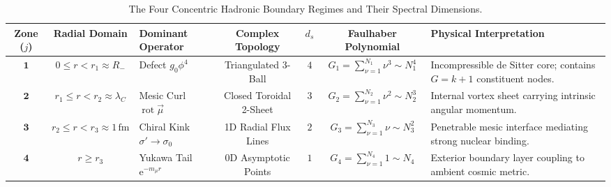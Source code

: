 \documentclass[
    12pt,
    a4paper,
    headings=normal,
    twoside=false,
    open=any,
    parskip=half
]{scrbook}
\newcommand{\eu}{\mathrm{e}}
\begin{document}
\begin{table}[htbp]
\centering
\small
\caption{The Four Concentric Hadronic Boundary Regimes and Their Spectral Dimensions.}
\label{tab:ch3_concentric_zones_summary}
\begin{adjustbox}{max width=\textwidth}
\begin{tabular}{cclcccp{5.0cm}}\toprule
\textbf{Zone ($j$)} & \textbf{Radial Domain} & \textbf{Dominant Operator} & \textbf{Complex Topology} & $d_s$ & \textbf{Faulhaber Polynomial} & \textbf{Physical Interpretation} \\\midrule
\rowcolor{secondarycolor!8}
$\mathbf{1}$ & $0 \le r < r_1 \approx R_-$ & Defect $g_0 \phi^4$ & Triangulated 3-Ball & $4$ & $G_1 = \sum_{\nu=1}^{N_1} \nu^3 \sim N_1^4$ & Incompressible de Sitter core; contains $G = k+1$ constituent nodes. \\
$\mathbf{2}$ & $r_1 \le r < r_2 \approx \lambda_C$ & Mesic Curl $\operatorname{rot}\vec{\mu}$ & Closed Toroidal 2-Sheet & $3$ & $G_2 = \sum_{\nu=1}^{N_2} \nu^2 \sim N_2^3$ & Internal vortex sheet carrying intrinsic angular momentum. \\
\rowcolor{secondarycolor!8}
$\mathbf{3}$ & $r_2 \le r < r_3 \approx 1\,\text{fm}$ & Chiral Kink $\sigma' \to \sigma_0$ & 1D Radial Flux Lines & $2$ & $G_3 = \sum_{\nu=1}^{N_3} \nu \sim N_3^2$ & Penetrable mesic interface mediating strong nuclear binding. \\
$\mathbf{4}$ & $r \ge r_3$ & Yukawa Tail $\eu^{-m_\mu r}$ & 0D Asymptotic Points & $1$ & $G_4 = \sum_{\nu=1}^{N_4} 1 \sim N_4$ & Exterior boundary layer coupling to ambient cosmic metric. \\\bottomrule
\end{tabular}
\end{adjustbox}
\end{table}
\end{document}
